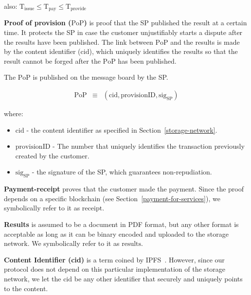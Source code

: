 \documentclass[pdftex,twocolumn,epjc3]{svjour3}
\begin{document}
{also:
\(\mathrm{T}_\mathrm{issue} \leq \mathrm{T}_\mathrm{pay} \leq \mathrm{T}_\mathrm{provide}\)

\noindent \textbf
{Proof of provision ($\mathrm{PoP}$)}\label{proof-of-provision} is proof that the SP published the result at a certain time. It protects the SP in case the customer unjustifiably starts a dispute after the results have been published. The link between $\mathrm{PoP}$ and the results is made by the content identifier ($\mathrm{cid}$), which uniquely identifies the results so that the result cannot be forged after the $\mathrm{PoP}$ has been published.

The $\mathrm{PoP}$ is published on the message board by the SP.


\begin{eqnarray}
\mathrm{PoP} & \equiv & (\mathrm{cid}, \mathrm{provisionID}, \mathrm{sig}_\mathrm{SP})
\end{eqnarray}

where:

\begin{itemize}

\item $\mathrm{cid}$ - the content identifier as specified in Section~\ref{storage-network}.
\item $\mathrm{provisionID}$ - The number that uniquely identifies the transaction previously created by the customer.
\item $\mathrm{sig}_\mathrm{SP}$ - the signature of the SP, which guarantees non-repudiation.
\end{itemize}

\noindent \textbf
{Payment-receipt}\label{payment-receipt} proves that the customer made the payment. Since the proof depends on a specific blockchain (see Section~\ref{payment-for-services}), we symbolically refer to it as $\mathrm{receipt}$.

\noindent \textbf
{Results}\label{results} is assumed to be a document in PDF format, but any other format is acceptable as long as it can be binary encoded and uploaded to the storage network. We symbolically refer to it as $\mathrm{results}$.

\noindent \textbf
{Content Identifier (cid)}\label{content-identifier-cid} is a term coined by IPFS~\cite{ipfsContentIdentifiersCIDs}. However, since our protocol does not depend on this particular implementation of the storage network, we let the $\mathrm{cid}$ be any other identifier that securely and uniquely points to the content.

}
\end{document}
